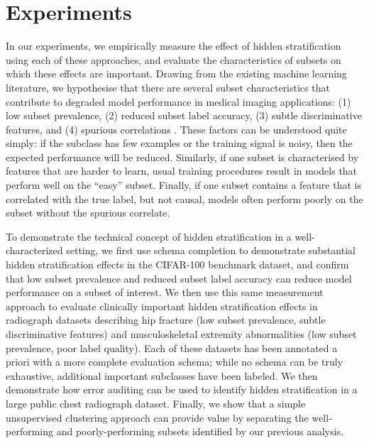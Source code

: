 \documentclass{article}
\begin{document}
\section{Experiments}

In our experiments, we empirically measure the effect of hidden stratification using each of these approaches, and evaluate the characteristics of subsets on which these effects are important.  
Drawing from the existing machine learning literature, we hypothesise that there are several subset characteristics that contribute to degraded model performance in medical imaging applications: (1) low subset prevalence, (2) reduced subset label accuracy, (3) subtle discriminative features, and (4) spurious correlations \citep{Selbst2017-gz}. 
These factors can be understood quite simply: if the subclass has few examples or the training signal is noisy, then the expected performance will be reduced.  Similarly, if one subset is characterised by features that are harder to learn, usual training procedures result in models that perform well on the ``easy'' subset.
Finally, if one subset contains a feature that is correlated with the true label, but not causal, models often perform poorly on the subset without the spurious correlate.

To demonstrate the technical concept of hidden stratification in a well-characterized setting, we first use schema completion to demonstrate substantial hidden stratification effects in the CIFAR-100 benchmark dataset, and confirm that low subset prevalence and reduced subset label accuracy can reduce model performance on a subset of interest.
We then use this same measurement approach to evaluate clinically important hidden stratification effects in radiograph datasets describing hip fracture (low subset prevalence, subtle discriminative features) and musculoskeletal extremity abnormalities (low subset prevalence, poor label quality).
Each of these datasets has been annotated a priori with a more complete evaluation schema; while no schema can be truly exhaustive, additional important subclasses have been labeled.
We then demonstrate how error auditing can be used to identify hidden stratification in a large public chest radiograph dataset.
Finally, we show that a simple unsupervised clustering approach can provide value by separating the well-performing and poorly-performing subsets identified by our previous analysis.
\end{document}
